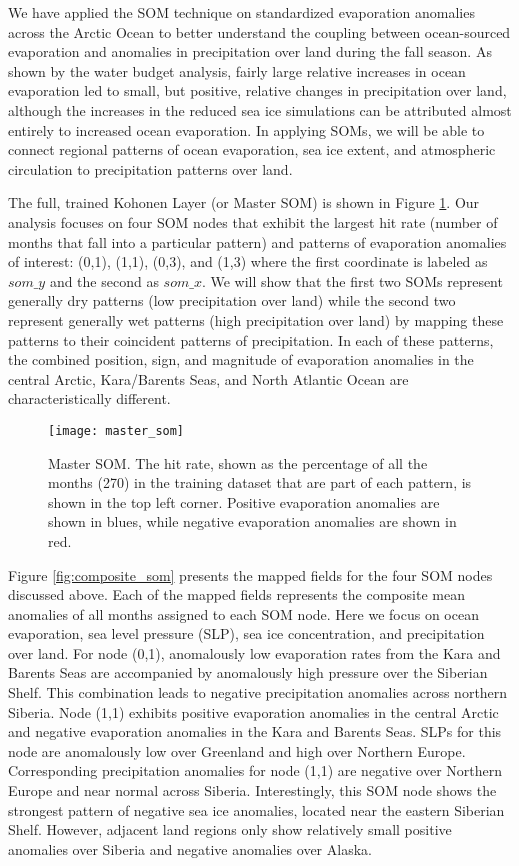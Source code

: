 We have applied the SOM technique on standardized evaporation anomalies across the Arctic Ocean to better understand the coupling between ocean-sourced evaporation and anomalies in precipitation over land during the fall season.
As shown by the water budget analysis, fairly large relative increases in ocean evaporation led to small, but positive, relative changes in precipitation over land, although the increases in the reduced sea ice simulations can be attributed almost entirely to increased ocean evaporation.
In applying SOMs, we will be able to connect regional patterns of ocean evaporation, sea ice extent, and atmospheric circulation to precipitation patterns over land.

The full, trained Kohonen Layer (or Master SOM) is shown in Figure \ref{fig:master_som}.
Our analysis focuses on four SOM nodes that exhibit the largest hit rate (number of months that fall into a particular pattern) and patterns of evaporation anomalies of interest: (0,1), (1,1), (0,3), and (1,3) where the first coordinate is labeled as $som\_y$ and the second as $som\_x$.
We will show that the first two SOMs represent generally dry patterns (low precipitation over land) while the second two represent generally wet patterns (high precipitation over land) by mapping these patterns to their coincident patterns of precipitation.
In each of these patterns, the combined position, sign, and magnitude of evaporation anomalies in the central Arctic, Kara/Barents Seas, and North Atlantic Ocean are characteristically different.

\begin{figure}
  \centering
  \texttt{[image: master\_som]}
  \caption{Master SOM. The hit rate, shown as the percentage of all the months (270) in the training dataset that are part of each pattern, is shown in the top left corner. Positive evaporation anomalies are shown in blues, while negative evaporation anomalies are shown in red.}
  \label{fig:master_som}
\end{figure}

Figure \ref{fig:composite_som} presents the mapped fields for the four SOM nodes discussed above.
Each of the mapped fields represents the composite mean anomalies of all months assigned to each SOM node.
Here we focus on ocean evaporation, sea level pressure (SLP), sea ice concentration, and precipitation over land.
For node (0,1), anomalously low evaporation rates from the Kara and Barents Seas are accompanied by anomalously high pressure over the Siberian Shelf.
This combination leads to negative precipitation anomalies across northern Siberia.
Node (1,1) exhibits positive evaporation anomalies in the central Arctic and negative evaporation anomalies in the Kara and Barents Seas.
SLPs for this node are anomalously low over Greenland and high over Northern Europe.
Corresponding precipitation anomalies for node (1,1) are negative over Northern Europe and near normal across Siberia.
Interestingly, this SOM node shows the strongest pattern of negative sea ice anomalies, located near the eastern Siberian Shelf.
However, adjacent land regions only show relatively small positive anomalies over Siberia and negative anomalies over Alaska.

